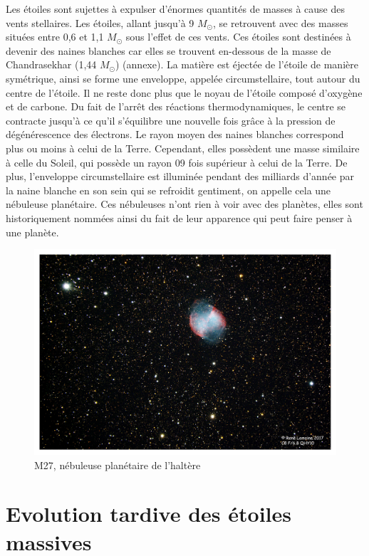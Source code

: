 Les étoiles sont sujettes à expulser d’énormes quantités de masses à cause des vents stellaires. Les étoiles, allant jusqu’à 9 $M_\odot$, se retrouvent avec des masses situées entre 0,6 et 1,1 $M_\odot$ sous l’effet de ces vents. Ces étoiles sont destinées à devenir des naines blanches car elles se trouvent en-dessous de la masse de Chandrasekhar (1,44 $M_\odot$) (annexe). La matière est éjectée de l’étoile de manière symétrique, ainsi se forme une enveloppe, appelée circumstellaire, tout autour du centre de l’étoile. Il ne reste donc plus que le noyau de l’étoile composé d’oxygène et de carbone. Du fait de l’arrêt des réactions thermodynamiques, le centre se contracte jusqu’à ce qu’il s’équilibre une nouvelle fois grâce à la pression de dégénérescence des électrons. Le rayon moyen des naines blanches correspond plus ou moins à celui de la Terre. Cependant, elles possèdent une masse similaire à celle du Soleil, qui possède un rayon 09 fois supérieur à celui de la Terre. De plus, l’enveloppe circumstellaire est illuminée pendant des milliards d’année par la naine blanche en son sein qui se refroidit gentiment, on appelle cela une nébuleuse planétaire. Ces nébuleuses n’ont rien à voir avec des planètes, elles sont historiquement nommées ainsi du fait de leur apparence qui peut faire penser à une planète.\newpage 

\begin{figure}[H]\vspace{1cm}
	\centering
	\includegraphics[scale=0.4]{images/m27}
	\caption{M27, nébuleuse planétaire de l'haltère}
\end{figure}  

\section{Evolution tardive des étoiles massives}

